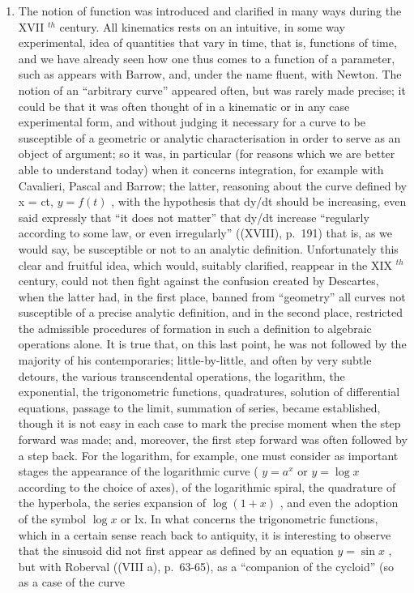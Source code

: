 \begin{enumerate}
\def\labelenumi{\Alph{enumi})}
\setcounter{enumi}{6}
\tightlist
\item
  The notion of function was introduced and clarified in many ways during the XVII \(^{th}\) century. All kinematics rests on an intuitive, in some way experimental, idea of quantities that vary in time, that is, functions of time, and we have already seen how one thus comes to a function of a parameter, such as appears with Barrow, and, under the name fluent, with Newton. The notion of an ``arbitrary curve'' appeared often, but was rarely made precise; it could be that it was often thought of in a kinematic or in any case experimental form, and without judging it necessary for a curve to be susceptible of a geometric or analytic characterisation in order to serve as an object of argument; so it was, in particular (for reasons which we are better able to understand today) when it concerns integration, for example with Cavalieri, Pascal and Barrow; the latter, reasoning about the curve defined by x = ct, \(y = f(t)\) , with the hypothesis that dy/dt should be increasing, even said expressly that ``it does not matter'' that dy/dt increase ``regularly according to some law, or even irregularly'' ((XVIII), p.~191) that is, as we would say, be susceptible or not to an analytic definition. Unfortunately this clear and fruitful idea, which would, suitably clarified, reappear in the XIX \(^{th}\) century, could not then fight against the confusion created by Descartes, when the latter had, in the first place, banned from ``geometry'' all curves not susceptible of a precise analytic definition, and in the second place, restricted the admissible procedures of formation in such a definition to algebraic operations alone. It is true that, on this last point, he was not followed by the majority of his contemporaries; little-by-little, and often by very subtle detours, the various transcendental operations, the logarithm, the exponential, the trigonometric functions, quadratures, solution of differential equations, passage to the limit, summation of series, became established, though it is not easy in each case to mark the precise moment when the step forward was made; and, moreover, the first step forward was often followed by a step back. For the logarithm, for example, one must consider as important stages the appearance of the logarithmic curve ( \(y = a^{x}\) or \(y = \log x\) according to the choice of axes), of the logarithmic spiral, the quadrature of the hyperbola, the series expansion of \(\log(1+x)\) , and even the adoption of the symbol \(\log x\) or lx. In what concerns the trigonometric functions, which in a certain sense reach back to antiquity, it is interesting to observe that the sinusoid did not first appear as defined by an equation \(y = \sin x\) , but with Roberval ((VIII a), p.~63-65), as a ``companion of the cycloid'' (so as a case of the curve
\end{enumerate}


